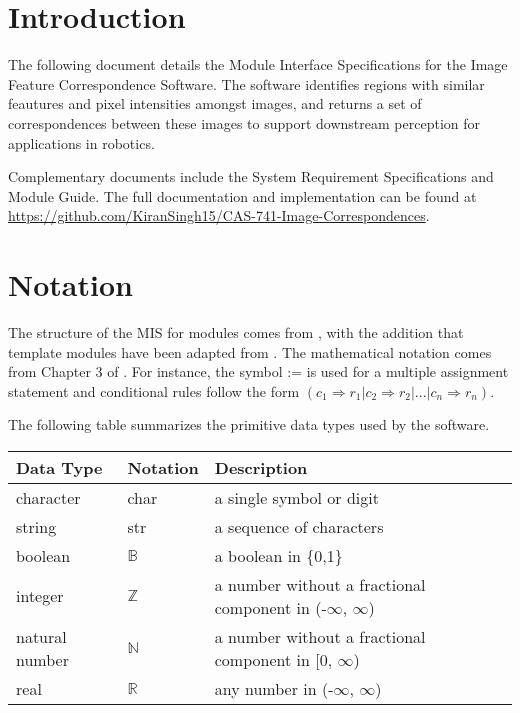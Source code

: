 \documentclass[12pt, titlepage]{article}
\begin{document}
\newpage

\tableofcontents

\newpage


\section{Introduction}

The following document details the Module Interface Specifications for
the Image Feature Correspondence Software. The software identifies regions with similar feautures and pixel 
intensities amongst images, and returns a set of correspondences between these images to support downstream 
perception for applications in robotics.

Complementary documents include the System Requirement Specifications
and Module Guide.  The full documentation and implementation can be
found at \url{https://github.com/KiranSingh15/CAS-741-Image-Correspondences}.

\section{Notation}
The structure of the MIS for modules comes from \citet{HoffmanAndStrooper1995},
with the addition that template modules have been adapted from
\cite{GhezziEtAl2003}.  The mathematical notation comes from Chapter 3 of
\citet{HoffmanAndStrooper1995}.  For instance, the symbol := is used for a
multiple assignment statement and conditional rules follow the form $(c_1
\Rightarrow r_1 | c_2 \Rightarrow r_2 | ... | c_n \Rightarrow r_n )$.

The following table summarizes the primitive data types used by the \progname software. 

\begin{center}
\renewcommand{\arraystretch}{1.2}
\noindent 
\begin{tabular}{l l p{7.5cm}} 
\toprule 
\textbf{Data Type} & \textbf{Notation} & \textbf{Description}\\ 
\midrule
character & char & a single symbol or digit\\
string & str & a sequence of characters\\
boolean & $\mathbb{B}$ & a boolean in \{0,1\}\\
integer & $\mathbb{Z}$ & a number without a fractional component in (-$\infty$, $\infty$) \\
natural number & $\mathbb{N}$ & a number without a fractional component in [0, $\infty$) \\
real & $\mathbb{R}$ & any number in (-$\infty$, $\infty$)\\
\bottomrule
\end{tabular} 
\end{center}
\end{document}
